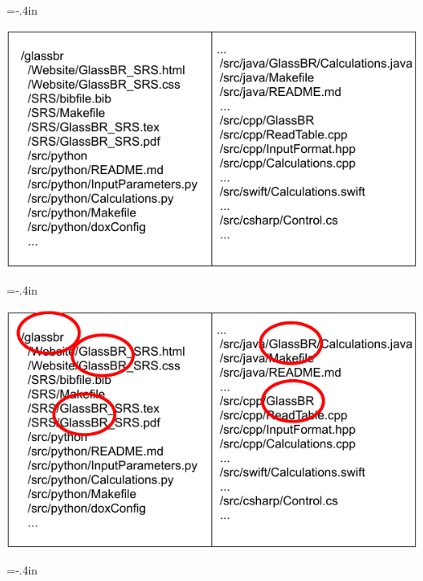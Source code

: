 \documentclass[usenames]{beamer}
\begin{document}
\hoffset=-.4in
\begin{frame}


\includegraphics[width=1.05\textwidth]{../figures/FoldersFiles.pdf}

\end{frame}
\hoffset=0in
\hoffset=-.4in
\begin{frame}


\includegraphics[width=1.05\textwidth]{../figures/FoldersFilesCircleGlassBR.pdf}

\end{frame}
\hoffset=0in
\hoffset=-.4in
\end{document}
